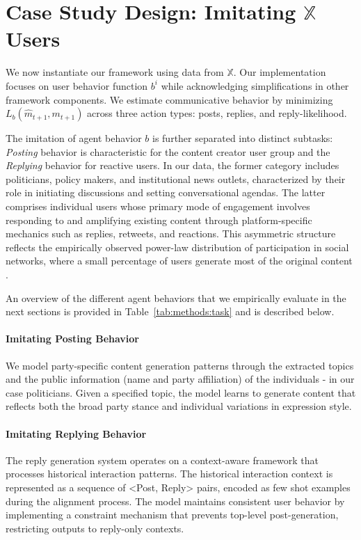 \section{Case Study Design: Imitating $\mathbb{X}$ Users}
\label{sec:twon}

We now instantiate our framework using data from $\mathbb{X}$. Our implementation focuses on user behavior function $b^i$ while acknowledging simplifications in other framework components. We estimate communicative behavior by minimizing $L_b(\widehat{m}_{t+1}, m_{t+1})$ across three action types: posts, replies, and reply-likelihood.

The imitation of agent behavior $b$ is further separated into distinct subtasks: \emph{Posting} behavior is characteristic for the content creator user group and the \emph{Replying} behavior for reactive users. In our data, the former category includes politicians, policy makers, and institutional news outlets, characterized by their role in initiating discussions and setting conversational agendas. The latter comprises individual users whose primary mode of engagement involves responding to and amplifying existing content through platform-specific mechanics such as replies, retweets, and reactions. This asymmetric structure reflects the empirically observed power-law distribution of participation in social networks, where a small percentage of users generate most of the original content \citep{carron2014describing, sun2014understanding}.

An overview of the different agent behaviors that we empirically evaluate in the next sections is provided in Table~\ref{tab:methods:task} and is described below.

\paragraph{Imitating Posting Behavior}
We model party-specific content generation patterns through the extracted topics and the public information (name and party affiliation) of the individuals - in our case politicians. Given a specified topic, the model learns to generate content that reflects both the broad party stance and individual variations in expression style.

\paragraph{Imitating Replying Behavior}
The reply generation system operates on a context-aware framework that processes historical interaction patterns. The historical interaction context is represented as a sequence of <Post, Reply> pairs, encoded as few shot examples during the alignment process. The model maintains consistent user behavior by implementing a constraint mechanism that prevents top-level post-generation, restricting outputs to reply-only contexts. 

